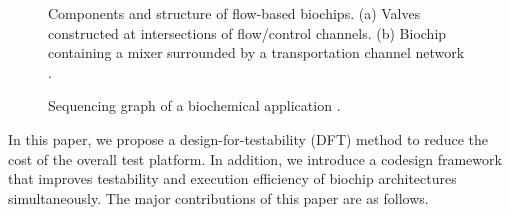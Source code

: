 \begin{figure}
\figurefontsize
\centering

\caption{Components and structure of flow-based biochips. 
(a) Valves constructed at intersections of flow/control channels. 
(b) Biochip containing a mixer surrounded by a transportation channel network 
\cite{ESWD13}.}
\label{fig:valve_mixer_chip}
\end{figure}

\begin{figure}
\figurefontsize
\centering

\caption{Sequencing graph of a biochemical application \cite{MinhassPMB12}.}
\label{fig:sequencing_graph}
\end{figure}

In this paper, we propose a design-for-testability (DFT) method to reduce the
cost of the overall test platform. In addition, we introduce a codesign
framework that improves testability and execution efficiency of biochip
architectures simultaneously. The major contributions of this paper are as
follows.

